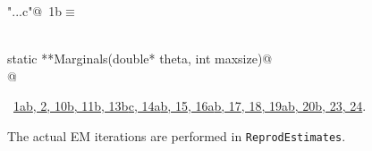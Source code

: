 \documentclass[reqno]{amsart}
\renewcommand{\NWtarget}[2]{\hypertarget{#1}{#2}}
\renewcommand{\NWlink}[2]{\hyperlink{#1}{#2}}
\begin{document}
\begin{flushleft} \small\label{scrap2}\raggedright\small
\NWtarget{nuweb1b}{} \verb@"..\src\ReprodCalcs.c"@\nobreak\ {\footnotesize {1b}}$\equiv$
\vspace{-1ex}
\begin{list}{}{} \item
\mbox{}\verb@@\\
\mbox{}\verb@double static **Marginals(double* theta, int maxsize)@\\
\mbox{}@\\
\mbox{}\verb@@{\NWsep}
\end{list}
\vspace{-1.5ex}
\footnotesize
\begin{list}{}{\setlength{\itemsep}{-\parsep}\setlength{\itemindent}{-\leftmargin}}
\item \NWtxtFileDefBy\ \NWlink{nuweb1a}{1a}\NWlink{nuweb1b}{b}\NWlink{nuweb2}{, 2}\NWlink{nuweb10b}{, 10b}\NWlink{nuweb11b}{, 11b}\NWlink{nuweb13b}{, 13b}\NWlink{nuweb13c}{c}\NWlink{nuweb14a}{, 14a}\NWlink{nuweb14b}{b}\NWlink{nuweb15}{, 15}\NWlink{nuweb16a}{, 16a}\NWlink{nuweb16b}{b}\NWlink{nuweb17}{, 17}\NWlink{nuweb18}{, 18}\NWlink{nuweb19a}{, 19a}\NWlink{nuweb19b}{b}\NWlink{nuweb20b}{, 20b}\NWlink{nuweb23}{, 23}\NWlink{nuweb24}{, 24}.

\item{}
\end{list}
\vspace{4ex}
\end{flushleft}
The actual EM iterations are performed in \texttt{ReprodEstimates}.
\end{document}
